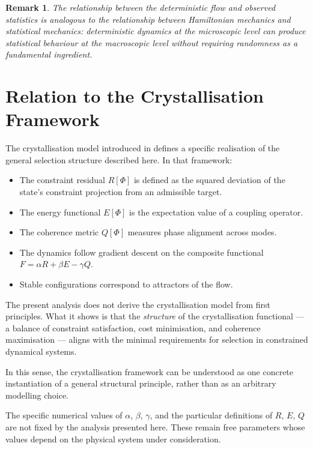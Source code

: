 \documentclass[12pt]{article}
\newtheorem{remark}[theorem]{Remark}
\begin{document}
\begin{remark}
The relationship between the deterministic flow and observed statistics is analogous to the relationship between Hamiltonian mechanics and statistical mechanics: deterministic dynamics at the microscopic level can produce statistical behaviour at the macroscopic level without requiring randomness as a fundamental ingredient.
\end{remark}

\section{Relation to the Crystallisation Framework}\label{sec:crystallisation}

The crystallisation model introduced in \citet{Smart2026} defines a specific realisation of the general selection structure described here. In that framework:
\begin{itemize}
    \item The constraint residual $R[\Phi]$ is defined as the squared deviation of the state's constraint projection from an admissible target.
    \item The energy functional $E[\Phi]$ is the expectation value of a coupling operator.
    \item The coherence metric $Q[\Phi]$ measures phase alignment across modes.
    \item The dynamics follow gradient descent on the composite functional $F = \alpha R + \beta E - \gamma Q$.
    \item Stable configurations correspond to attractors of the flow.
\end{itemize}

The present analysis does not derive the crystallisation model from first principles. What it shows is that the \textit{structure} of the crystallisation functional --- a balance of constraint satisfaction, cost minimisation, and coherence maximisation --- aligns with the minimal requirements for selection in constrained dynamical systems.

In this sense, the crystallisation framework can be understood as one concrete instantiation of a general structural principle, rather than as an arbitrary modelling choice.

The specific numerical values of $\alpha$, $\beta$, $\gamma$, and the particular definitions of $R$, $E$, $Q$ are not fixed by the analysis presented here. These remain free parameters whose values depend on the physical system under consideration.
\end{document}

